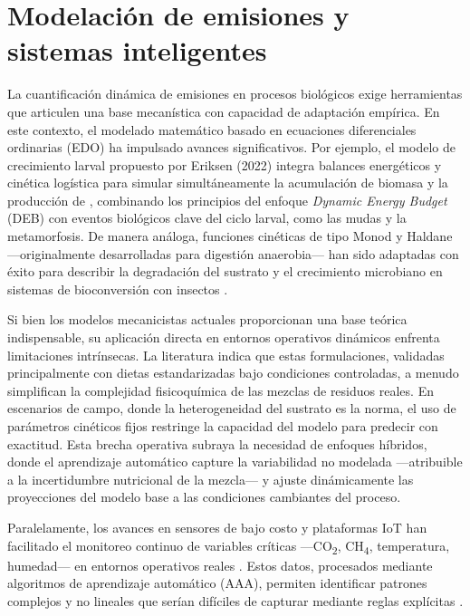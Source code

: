 \section{Modelación de emisiones y sistemas inteligentes}

La cuantificación dinámica de emisiones en procesos biológicos exige herramientas que articulen una base mecanística con capacidad de adaptación empírica. En este contexto, el modelado matemático basado en ecuaciones diferenciales ordinarias (EDO) ha impulsado avances significativos. Por ejemplo, el modelo de crecimiento larval propuesto por Eriksen (2022) integra balances energéticos y cinética logística para simular simultáneamente la acumulación de biomasa y la producción de , combinando los principios del enfoque \textit{Dynamic Energy Budget} (DEB) con eventos biológicos clave del ciclo larval, como las mudas y la metamorfosis. De manera análoga, funciones cinéticas de tipo Monod y Haldane —originalmente desarrolladas para digestión anaerobia— han sido adaptadas con éxito para describir la degradación del sustrato y el crecimiento microbiano en sistemas de bioconversión con insectos \parencite{winAnaerobicDigestionBlack2018a, ahlamineMathematicalAnalysisAnaerobic2024}. 

Si bien los modelos mecanicistas actuales proporcionan una base teórica indispensable, su aplicación directa en entornos operativos dinámicos enfrenta limitaciones intrínsecas. La literatura \parencite{bekkerImpactSubstrateMoisture2021a,rossiEstimatingDynamicsGreenhouse2024a} indica que estas formulaciones, validadas principalmente con dietas estandarizadas bajo condiciones controladas, a menudo simplifican la complejidad fisicoquímica de las mezclas de residuos reales. En escenarios de campo, donde la heterogeneidad del sustrato es la norma, el uso de parámetros cinéticos fijos restringe la capacidad del modelo para predecir con exactitud. Esta brecha operativa subraya la necesidad de enfoques híbridos, donde el aprendizaje automático capture la variabilidad no modelada —atribuible a la incertidumbre nutricional de la mezcla— y ajuste dinámicamente las proyecciones del modelo base a las condiciones cambiantes del proceso.

Paralelamente, los avances en sensores de bajo costo y plataformas IoT han 
facilitado el monitoreo continuo de variables críticas —CO\textsubscript{2}, 
CH\textsubscript{4}, temperatura, humedad— en entornos operativos reales 
\parencite{rajRealTimeEstimation2023a,duobieneDevelopmentWirelessSensor2022,
yavariArtEMonArtificialIntelligence2023}. Estos datos, procesados mediante 
algoritmos de aprendizaje automático (AAA), permiten identificar patrones 
complejos y no lineales que serían difíciles de capturar mediante reglas 
explícitas \parencite{weichertReviewMachineLearning2019,chenOptimizationModelProcess2021a}. 

